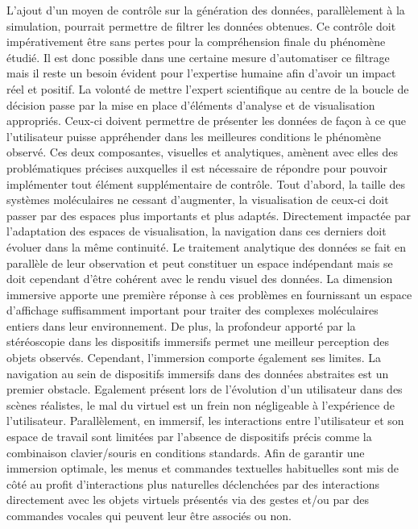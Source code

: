 L'ajout d'un moyen de contrôle sur la génération des données, parallèlement à la simulation, pourrait permettre de filtrer les données obtenues. Ce contrôle doit impérativement être sans pertes pour la compréhension finale du phénomène étudié. Il est donc possible dans une certaine mesure d'automatiser ce filtrage mais il reste un besoin évident pour l'expertise humaine afin d'avoir un impact réel et positif. La volonté de mettre l'expert scientifique au centre de la boucle de décision passe par la mise en place d'éléments d'analyse et de visualisation appropriés. Ceux-ci doivent permettre de présenter les données de façon à ce que l'utilisateur puisse appréhender dans les meilleures conditions le phénomène observé. Ces deux composantes, visuelles et analytiques, amènent avec elles des problématiques précises auxquelles il est nécessaire de répondre pour pouvoir implémenter tout élément supplémentaire de contrôle. Tout d'abord, la taille des systèmes moléculaires ne cessant d'augmenter, la visualisation de ceux-ci doit passer par des espaces plus importants et plus adaptés. Directement impactée par l'adaptation des espaces de visualisation, la navigation dans ces derniers doit évoluer dans la même continuité. Le traitement analytique des données se fait en parallèle de leur observation et peut constituer un espace indépendant mais se doit cependant d'être cohérent avec le rendu visuel des données. La dimension immersive apporte une première réponse à ces problèmes en fournissant un espace d'affichage suffisamment important pour traiter des complexes moléculaires entiers dans leur environnement. De plus, la profondeur apporté par la stéréoscopie dans les dispositifs immersifs permet une meilleur perception des objets observés. Cependant, l'immersion comporte également ses limites. La navigation au sein de dispositifs immersifs dans des données abstraites est un premier obstacle. Egalement présent lors de l'évolution d'un utilisateur dans des scènes réalistes, le mal du virtuel est un frein non négligeable à l'expérience de l'utilisateur. Parallèlement, en immersif, les interactions entre l'utilisateur et son espace de travail sont limitées par l'absence de dispositifs précis comme la combinaison clavier/souris en conditions standards. Afin de garantir une immersion optimale, les menus et commandes textuelles habituelles sont mis de côté au profit d'interactions plus naturelles déclenchées par des interactions directement avec les objets virtuels présentés via des gestes et/ou par des commandes vocales qui peuvent leur être associés ou non.

